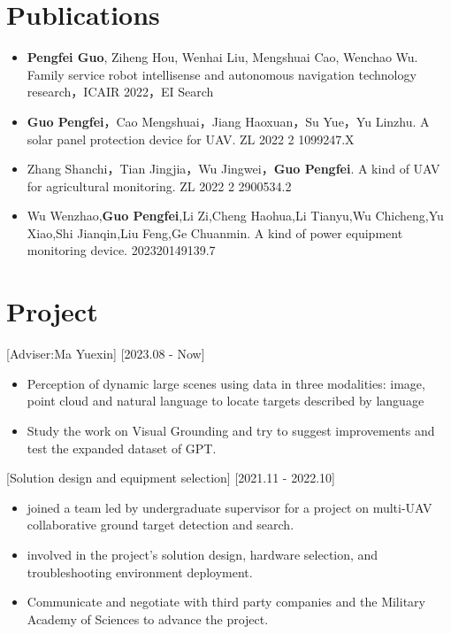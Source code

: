 \documentclass{resume}
\begin{document}
\section{Publications}
\begin{itemize}
  \item \textbf{Pengfei Guo}, Ziheng Hou, Wenhai Liu, Mengshuai Cao, Wenchao Wu. Family service robot intellisense and autonomous navigation technology research，ICAIR 2022，EI Search
  \item \textbf{Guo Pengfei}，Cao Mengshuai，Jiang Haoxuan，Su Yue，Yu Linzhu. A solar panel protection device for UAV. ZL 2022 2 1099247.X
  \item Zhang Shanchi，Tian Jingjia，Wu Jingwei，\textbf{Guo Pengfei}. A kind of UAV for agricultural monitoring. ZL 2022 2 2900534.2
  \item Wu Wenzhao,\textbf{Guo Pengfei},Li Zi,Cheng Haohua,Li Tianyu,Wu Chicheng,Yu Xiao,Shi Jianqin,Liu Feng,Ge Chuanmin. A kind of power equipment monitoring device. 202320149139.7
\end{itemize}

\section{Project}
[Adviser:Ma Yuexin]
[2023.08 - Now]
\begin{itemize}
    \item Perception of dynamic large scenes using data in three modalities: image, point cloud and natural language to locate targets described by language
    \item Study the work on Visual Grounding and try to suggest improvements and test the expanded dataset of GPT.
\end{itemize}

[Solution design and equipment selection]
[2021.11 - 2022.10] 

\begin{itemize}
  \item joined a team led by undergraduate supervisor for a project on multi-UAV collaborative ground target detection and search.
  \item involved in the project's solution design, hardware selection, and troubleshooting environment deployment.
  \item Communicate and negotiate with third party companies and the Military Academy of Sciences to advance the project.
\end{itemize}
\end{document}
